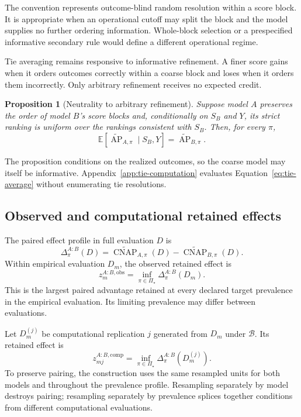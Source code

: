\documentclass[11pt]{article}
\newcommand{\AP}{\operatorname{AP}}
\newcommand{\CNAP}{\operatorname{CNAP}}
\newcommand{\PSet}{\Pi_\star}
\newcommand{\Boot}{\mathcal{B}}
\newcommand{\E}{\mathbb{E}}
\newcommand{\APta}{\widetilde{\AP}}
\newcommand{\CNAPta}{\widetilde{\CNAP}}
\newtheorem{proposition}{Proposition}
\theoremstyle{remark}
\begin{document}
The convention represents outcome-blind random resolution within a score
block. It is appropriate when an operational cutoff may split the block and
the model supplies no further ordering information. Whole-block selection or
a prespecified informative secondary rule would define a different operational
regime.

Tie averaging remains responsive to informative refinement. A finer score
gains when it orders outcomes correctly within a coarse block and loses when it
orders them incorrectly. Only arbitrary refinement receives no expected
credit.

\begin{proposition}[Neutrality to arbitrary refinement]
\label{prop:refinement}
Suppose model $A$ preserves the order of model $B$'s score blocks and,
conditionally on $S_B$ and $Y$, its strict ranking is uniform over the rankings
consistent with $S_B$. Then, for every $\pi$,
\[
\E[\APta_{A,\pi}\mid S_B,Y]=\APta_{B,\pi}.
\]
\end{proposition}

The proposition conditions on the realized outcomes, so the coarse model may
itself be informative. Appendix~\ref{app:tie-computation} evaluates
Equation~\eqref{eq:tie-average} without enumerating tie resolutions.

\subsection{Observed and computational retained effects}

The paired effect profile in full evaluation $D$ is
\begin{equation}
\Delta^{A:B}_\pi(D)
=
\CNAPta_{A,\pi}(D)-\CNAPta_{B,\pi}(D).
\label{eq:paired-profile}
\end{equation}
Within empirical evaluation $D_m$, the observed retained effect is
\begin{equation}
z_m^{A:B,\mathrm{obs}}
=
\inf_{\pi\in\PSet}\Delta^{A:B}_\pi(D_m).
\label{eq:observed-retained}
\end{equation}
This is the largest paired advantage retained at every declared target
prevalence in the empirical evaluation. Its limiting prevalence may differ
between evaluations.

Let $D_m^{(j)}$ be computational replication $j$ generated from $D_m$ under
$\Boot$. Its retained effect is
\begin{equation}
z_{mj}^{A:B,\mathrm{comp}}
=
\inf_{\pi\in\PSet}\Delta^{A:B}_\pi(D_m^{(j)}).
\label{eq:computational-retained}
\end{equation}
To preserve pairing, the construction uses the same resampled units for both
models and throughout the prevalence profile. Resampling separately by model
destroys pairing; resampling separately by prevalence splices together
conditions from different computational evaluations.
\end{document}
